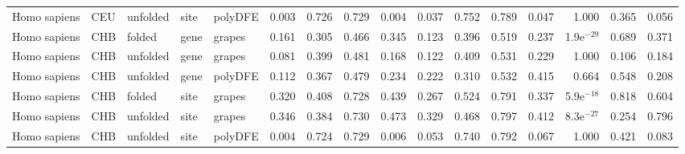 \begin{longtable}{lllllrrrrrrrrrrr}
        Homo sapiens &                       CEU &  unfolded &  site &  polyDFE &                              0.003 &                               0.726 &                 0.729 &                 0.004 &                              0.037 &                               0.752 &                 0.789 &                 0.047 &         1.000 &  0.365 &  0.056 \\
        Homo sapiens &                       CHB &    folded &  gene &   grapes &                              0.161 &                               0.305 &                 0.466 &                 0.345 &                              0.123 &                               0.396 &                 0.519 &                 0.237 &  1.9e$^{-29}$ &  0.689 &  0.371 \\
        Homo sapiens &                       CHB &  unfolded &  gene &   grapes &                              0.081 &                               0.399 &                 0.481 &                 0.168 &                              0.122 &                               0.409 &                 0.531 &                 0.229 &         1.000 &  0.106 &  0.184 \\
        Homo sapiens &                       CHB &  unfolded &  gene &  polyDFE &                              0.112 &                               0.367 &                 0.479 &                 0.234 &                              0.222 &                               0.310 &                 0.532 &                 0.415 &         0.664 &  0.548 &  0.208 \\
        Homo sapiens &                       CHB &    folded &  site &   grapes &                              0.320 &                               0.408 &                 0.728 &                 0.439 &                              0.267 &                               0.524 &                 0.791 &                 0.337 &  5.9e$^{-18}$ &  0.818 &  0.604 \\
        Homo sapiens &                       CHB &  unfolded &  site &   grapes &                              0.346 &                               0.384 &                 0.730 &                 0.473 &                              0.329 &                               0.468 &                 0.797 &                 0.412 &  8.3e$^{-27}$ &  0.254 &  0.796 \\
        Homo sapiens &                       CHB &  unfolded &  site &  polyDFE &                              0.004 &                               0.724 &                 0.729 &                 0.006 &                              0.053 &                               0.740 &                 0.792 &                 0.067 &         1.000 &  0.421 &  0.083 \\

\end{longtable}
